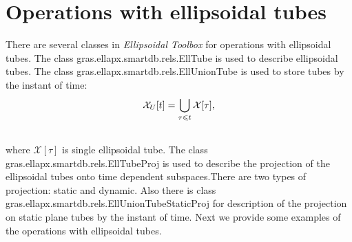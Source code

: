 \documentclass[letterpaper,10pt,english]{sphinxmanual}
\begin{document}
\section{Operations with ellipsoidal tubes}
\label{main_source:operations-with-ellipsoidal-tubes}
There are several classes in \emph{Ellipsoidal Toolbox} for operations with
ellipsoidal tubes. The class gras.ellapx.smartdb.rels.EllTube is used to
describe ellipsoidal tubes. The class
gras.ellapx.smartdb.rels.EllUnionTube is used to store tubes by the
instant of time:
\begin{gather}
\begin{split}{\mathcal X}_{U}[t]=\bigcup \limits_{\tau\leqslant t}{\mathcal X}[\tau],\end{split}\notag\\\begin{split}\end{split}\notag
\end{gather}
where ${\mathcal X}[\tau]$ is single ellipsoidal tube. The class
gras.ellapx.smartdb.rels.EllTubeProj is used to describe the projection
of the ellipsoidal tubes onto time dependent subspaces.There are two
types of projection: static and dynamic. Also there is class
gras.ellapx.smartdb.rels.EllUnionTubeStaticProj for description of the
projection on static plane tubes by the instant of time. Next we provide
some examples of the operations with ellipsoidal tubes.
\end{document}
